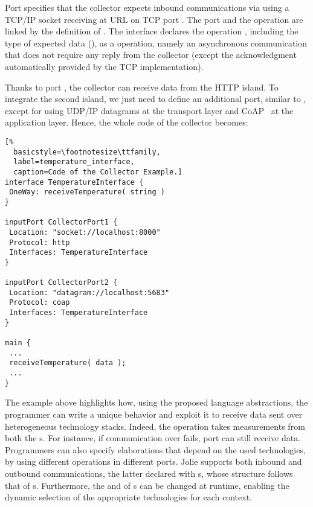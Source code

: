 Port  specifies that the collector expects inbound
communications via   using a TCP/IP socket receiving
at URL  on TCP port . The port and the operation
are linked by the definition of 
. The interface declares the operation
, including the type of expected data
(), as a  operation, namely an asynchronous
communication that does not require any reply from the collector (except the
acknowledgment automatically provided by the TCP implementation).

Thanks to port , the collector can receive data from the
HTTP island. To integrate the second island, we just need to define an
additional port, similar to , except for using UDP/IP
datagrams at the transport layer and CoAP~\cite{doi:10.17487/RFC7252,coap} at the application layer. Hence, the
whole code of the collector becomes:
%
\begin{lstlisting}[%
  basicstyle=\footnotesize\ttfamily,
  label=temperature_interface,
  caption=Code of the Collector Example.]
interface TemperatureInterface {
 OneWay: receiveTemperature( string )
}

inputPort CollectorPort1 {
 Location: "socket://localhost:8000"
 Protocol: http
 Interfaces: TemperatureInterface
}

inputPort CollectorPort2 {
 Location: "datagram://localhost:5683"
 Protocol: coap
 Interfaces: TemperatureInterface
}

main {
 ...
 receiveTemperature( data );
 ...
}
\end{lstlisting}
%
The example above highlights how, using the proposed language abstractions, the
programmer can write a unique behavior and exploit it to receive data sent over
heterogeneous technology stacks. Indeed, the 
operation takes measurements from both the s.
%
For instance, if communication over  fails, port
 can still receive data.
%
Programmers can also specify elaborations that depend on the used technologies,
by using different operations in different ports.
Jolie supports both inbound and outbound
communications, the latter declared with s, whose structure
follows that of s. Furthermore, the  and
 of s can be changed at runtime, enabling the
dynamic selection of the appropriate technologies for each context.

